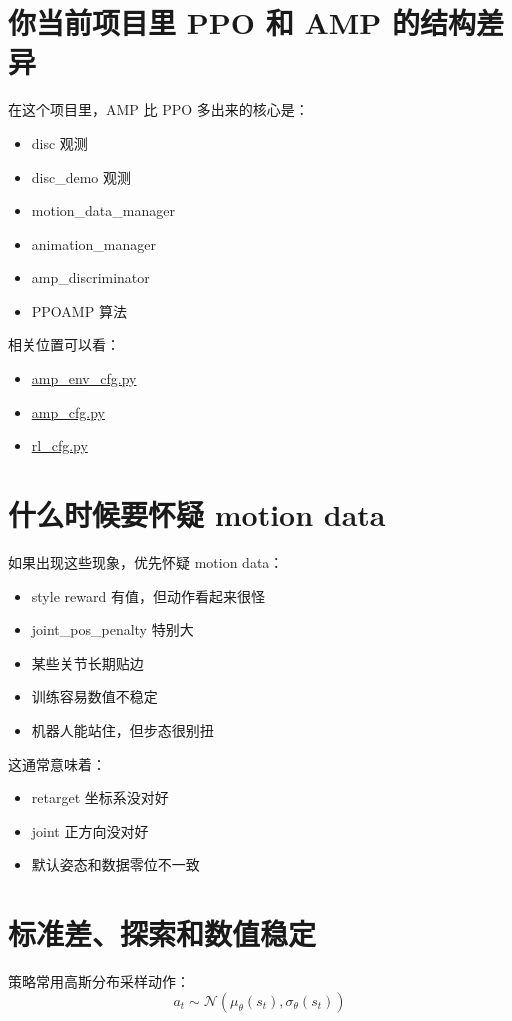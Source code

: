\documentclass[11pt,a4paper]{article}
\begin{document}
\section{你当前项目里 PPO 和 AMP 的结构差异}
在这个项目里，AMP 比 PPO 多出来的核心是：
\begin{itemize}
\item disc 观测
\item disc\_demo 观测
\item motion\_data\_manager
\item animation\_manager
\item amp\_discriminator
\item PPOAMP 算法
\end{itemize}

相关位置可以看：
\begin{itemize}
\item \href{/root/Desktop/Bipedal_AMP/source/legged_lab/legged_lab/tasks/locomotion/amp/amp_env_cfg.py}{amp\_env\_cfg.py}
\item \href{/root/Desktop/Bipedal_AMP/source/legged_lab/legged_lab/rsl_rl/amp_cfg.py}{amp\_cfg.py}
\item \href{/root/Desktop/Bipedal_AMP/source/legged_lab/legged_lab/rsl_rl/rl_cfg.py}{rl\_cfg.py}
\end{itemize}

\section{什么时候要怀疑 motion data}
如果出现这些现象，优先怀疑 motion data：
\begin{itemize}
\item style reward 有值，但动作看起来很怪
\item joint\_pos\_penalty 特别大
\item 某些关节长期贴边
\item 训练容易数值不稳定
\item 机器人能站住，但步态很别扭
\end{itemize}

这通常意味着：
\begin{itemize}
\item retarget 坐标系没对好
\item joint 正方向没对好
\item 默认姿态和数据零位不一致
\end{itemize}

\section{标准差、探索和数值稳定}
策略常用高斯分布采样动作：
\[
a_t \sim \mathcal{N}(\mu_\theta(s_t), \sigma_\theta(s_t))
\]
\end{document}
